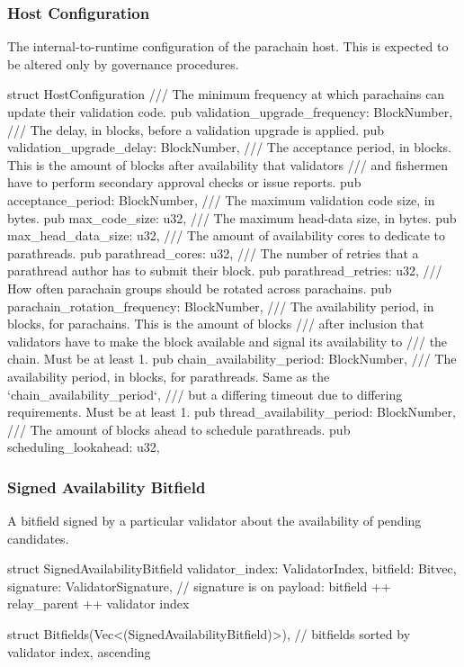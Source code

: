 \subsubsection{Host Configuration}

The internal-to-runtime configuration of the parachain host. This is expected to
be altered only by governance procedures.

\begin{verbnobox}[\small]
struct HostConfiguration {
  /// The minimum frequency at which parachains can update their validation code.
  pub validation_upgrade_frequency: BlockNumber,
  /// The delay, in blocks, before a validation upgrade is applied.
  pub validation_upgrade_delay: BlockNumber,
  /// The acceptance period, in blocks. This is the amount of blocks after availability that validators
  /// and fishermen have to perform secondary approval checks or issue reports.
  pub acceptance_period: BlockNumber,
  /// The maximum validation code size, in bytes.
  pub max_code_size: u32,
  /// The maximum head-data size, in bytes.
  pub max_head_data_size: u32,
  /// The amount of availability cores to dedicate to parathreads.
  pub parathread_cores: u32,
  /// The number of retries that a parathread author has to submit their block.
  pub parathread_retries: u32,
  /// How often parachain groups should be rotated across parachains.
  pub parachain_rotation_frequency: BlockNumber,
  /// The availability period, in blocks, for parachains. This is the amount of blocks
  /// after inclusion that validators have to make the block available and signal its availability to
  /// the chain. Must be at least 1.
  pub chain_availability_period: BlockNumber,
  /// The availability period, in blocks, for parathreads. Same as the `chain_availability_period`,
  /// but a differing timeout due to differing requirements. Must be at least 1.
  pub thread_availability_period: BlockNumber,
  /// The amount of blocks ahead to schedule parathreads.
  pub scheduling_lookahead: u32,
}
\end{verbnobox}

\subsubsection{Signed Availability Bitfield}

A bitfield signed by a particular validator about the availability of pending candidates.

\begin{verbnobox}[\small]
struct SignedAvailabilityBitfield {
  validator_index: ValidatorIndex,
  bitfield: Bitvec,
  signature: ValidatorSignature, // signature is on payload: bitfield ++ relay_parent ++ validator index
}

struct Bitfields(Vec<(SignedAvailabilityBitfield)>), // bitfields sorted by validator index, ascending
\end{verbnobox}

